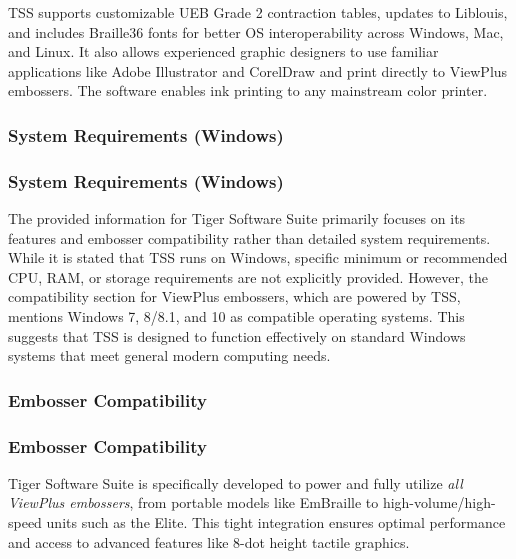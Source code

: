 TSS supports customizable UEB Grade 2 contraction tables, updates to Liblouis, and includes Braille36 fonts for better OS interoperability across Windows, Mac, and Linux. \cite{ElitaManual} It also allows experienced graphic designers to use familiar applications like Adobe Illustrator and CorelDraw and print directly to ViewPlus embossers. \cite{ElitaManual,DuxburyProducts,TouchMapper} The software enables ink printing to any mainstream color printer. \cite{ElitaManual}

\subsubsection{System Requirements (Windows)}

\subsubsection{System Requirements (Windows)}

The provided information for Tiger Software Suite primarily focuses on its features and embosser compatibility rather than detailed system requirements. While it is stated that TSS runs on Windows, specific minimum or recommended CPU, RAM, or storage requirements are not explicitly provided. \cite{EmeraldCoast,ElitaManual,DuxburyProducts,NimProQuick} However, the compatibility section for ViewPlus embossers, which are powered by TSS, mentions Windows 7, 8/8.1, and 10 as compatible operating systems. \cite{DuxburyProducts} This suggests that TSS is designed to function effectively on standard Windows systems that meet general modern computing needs.

\subsubsection{Embosser Compatibility}

\subsubsection{Embosser Compatibility}

Tiger Software Suite is specifically developed to power and fully utilize \emph{all ViewPlus embossers}, from portable models like EmBraille to high-volume/high-speed units such as the Elite. \cite{EmeraldCoast,ElitaManual,DuxburyProducts,NimProQuick} This tight integration ensures optimal performance and access to advanced features like 8-dot height tactile graphics. \cite{EmeraldCoast,DuxburyProducts}

